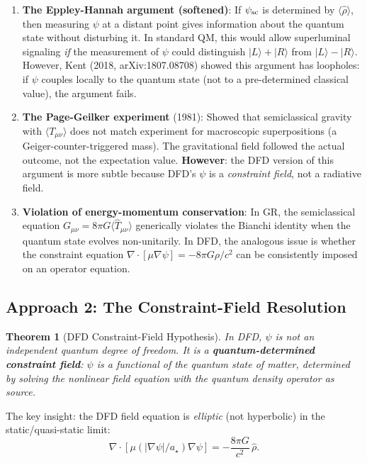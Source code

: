 \documentclass[11pt,a4paper]{article}
\newtheorem{theorem}{Theorem}
\begin{document}
\begin{enumerate}
\item \textbf{The Eppley-Hannah argument (softened)}: If $\psi_{\rm sc}$ is determined by $\langle\hat\rho\rangle$, then measuring $\psi$ at a distant point gives information about the quantum state without disturbing it. In standard QM, this would allow superluminal signaling \emph{if} the measurement of $\psi$ could distinguish $|L\rangle + |R\rangle$ from $|L\rangle - |R\rangle$. However, Kent (2018, arXiv:1807.08708) showed this argument has loopholes: if $\psi$ couples locally to the quantum state (not to a pre-determined classical value), the argument fails.

\item \textbf{The Page-Geilker experiment} (1981): Showed that semiclassical gravity with $\langle T_{\mu\nu}\rangle$ does not match experiment for macroscopic superpositions (a Geiger-counter-triggered mass). The gravitational field followed the actual outcome, not the expectation value. \textbf{However}: the DFD version of this argument is more subtle because DFD's $\psi$ is a \emph{constraint field}, not a radiative field.

\item \textbf{Violation of energy-momentum conservation}: In GR, the semiclassical equation $G_{\mu\nu} = 8\pi G\langle\hat{T}_{\mu\nu}\rangle$ generically violates the Bianchi identity when the quantum state evolves non-unitarily. In DFD, the analogous issue is whether the constraint equation $\nabla\cdot[\mu\nabla\psi] = -8\pi G\rho/c^2$ can be consistently imposed on an operator equation.
\end{enumerate}

\subsection{Approach 2: The Constraint-Field Resolution}
\label{sec:constraint-resolution}

\begin{theorem}[DFD Constraint-Field Hypothesis]
\label{thm:constraint}
In DFD, $\psi$ is not an independent quantum degree of freedom. It is a \textbf{quantum-determined constraint field}: $\psi$ is a functional of the quantum state of matter, determined by solving the nonlinear field equation with the quantum density operator as source.
\end{theorem}

The key insight: the DFD field equation is \emph{elliptic} (not hyperbolic) in the static/quasi-static limit:
\begin{equation}
\nabla\cdot[\mu(|\nabla\psi|/a_\star)\nabla\psi] = -\frac{8\pi G}{c^2}\,\hat{\rho}.
\end{equation}
\end{document}
